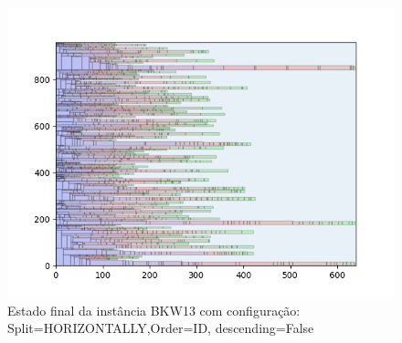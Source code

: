 \begin{figure}[H]
    \centering
    \caption[]{Estado final da instância BKW13 com configuração: Split=HORIZONTALLY,Order=ID, descending=False}
    \label{fig:bkw13-horizontally-id-false}
    \includegraphics[scale=0.5]{output/figures/bkw/bkw13/horizontally/id/false/0000}
\end{figure}